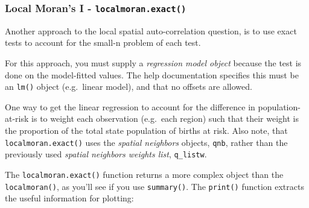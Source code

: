 \documentclass[
]{book}
\newenvironment{Shaded}{\begin{snugshade}}{\end{snugshade}}
\newcommand{\AttributeTok}[1]{\textcolor[rgb]{0.77,0.63,0.00}{#1}}
\newcommand{\CommentTok}[1]{\textcolor[rgb]{0.56,0.35,0.01}{\textit{#1}}}
\newcommand{\DecValTok}[1]{\textcolor[rgb]{0.00,0.00,0.81}{#1}}
\newcommand{\FunctionTok}[1]{\textcolor[rgb]{0.00,0.00,0.00}{#1}}
\newcommand{\NormalTok}[1]{#1}
\newcommand{\OtherTok}[1]{\textcolor[rgb]{0.56,0.35,0.01}{#1}}
\newcommand{\SpecialCharTok}[1]{\textcolor[rgb]{0.00,0.00,0.00}{#1}}
\begin{document}
\hypertarget{local-morans-i---localmoran.exact}{%
\subsubsection{\texorpdfstring{Local Moran's I - \texttt{localmoran.exact()}}{Local Moran's I - localmoran.exact()}}\label{local-morans-i---localmoran.exact}}

Another approach to the local spatial auto-correlation question, is to use exact tests to account for the small-n problem of each test.

For this approach, you must supply a \emph{regression model object} because the test is done on the model-fitted values. The help documentation specifies this must be an \texttt{lm()} object (e.g.~linear model), and that no offsets are allowed.

One way to get the linear regression to account for the difference in population-at-risk is to weight each observation (e.g.~each region) such that their weight is the proportion of the total state population of births at risk. Also note, that \texttt{localmoran.exact()} uses the \emph{spatial neighbors} objects, \texttt{qnb}, rather than the previously used \emph{spatial neighbors weights list}, \texttt{q\_listw}.

\begin{Shaded}
\end{Shaded}

The \texttt{localmoran.exact()} function returns a more complex object than the \texttt{localmoran()}, as you'll see if you use \texttt{summary()}. The \texttt{print()} function extracts the useful information for plotting:
\end{document}
